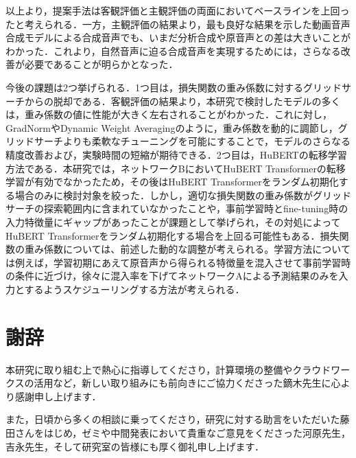 \documentclass[12pt]{jarticle}
\numberwithin{equation}{section}    %
\numberwithin{figure}{section}      %
\numberwithin{table}{section}      %
\begin{document}
以上より，提案手法は客観評価と主観評価の両面においてベースラインを上回ったと考えられる．一方，主観評価の結果より，最も良好な結果を示した動画音声合成モデルによる合成音声でも、いまだ分析合成や原音声との差は大きいことがわかった．これより，自然音声に迫る合成音声を実現するためには，さらなる改善が必要であることが明らかとなった．

今後の課題は2つ挙げられる．1つ目は，損失関数の重み係数に対するグリッドサーチからの脱却である．客観評価の結果より，本研究で検討したモデルの多くは，重み係数の値に性能が大きく左右されることがわかった．これに対し，GradNormやDynamic Weight Averagingのように，重み係数を動的に調節し，グリッドサーチよりも柔軟なチューニングを可能にすることで，モデルのさらなる精度改善および，実験時間の短縮が期待できる．2つ目は，HuBERTの転移学習方法である．本研究では，ネットワークBにおいてHuBERT Transformerの転移学習が有効でなかったため，その後はHuBERT Transformerをランダム初期化する場合のみに検討対象を絞った．しかし，適切な損失関数の重み係数がグリッドサーチの探索範囲内に含まれていなかったことや，事前学習時とfine-tuning時の入力特徴量にギャップがあったことが課題として挙げられ，その対処によってHuBERT Transformerをランダム初期化する場合を上回る可能性もある．損失関数の重み係数については、前述した動的な調整が考えられる。学習方法については例えば，学習初期にあえて原音声から得られる特徴量を混入させて事前学習時の条件に近づけ，徐々に混入率を下げてネットワークAによる予測結果のみを入力とするようスケジューリングする方法が考えられる．

\clearpage

\section*{謝辞}
本研究に取り組む上で熱心に指導してくださり，計算環境の整備やクラウドワークスの活用など，新しい取り組みにも前向きにご協力くださった鏑木先生に心より感謝申し上げます．

また，日頃から多くの相談に乗ってくださり，研究に対する助言をいただいた藤田さんをはじめ，ゼミや中間発表において貴重なご意見をくださった河原先生，吉永先生，そして研究室の皆様にも厚く御礼申し上げます．

\clearpage



\end{document}
